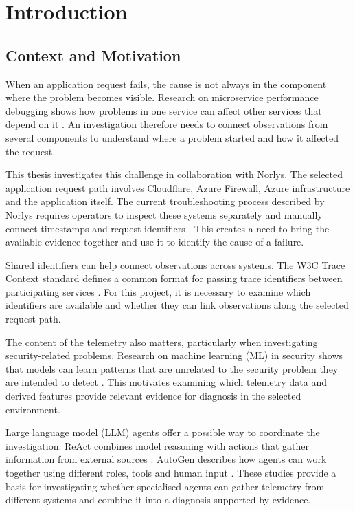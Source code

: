 \chapter{Introduction}
\label{cha:introduction}

\section{Context and Motivation}
\label{sec:introduction:context}

When an application request fails, the cause is not always in the component
where the problem becomes visible. Research on microservice performance
debugging shows how problems in one service can affect other services that
depend on it \parencite{gan2021sage}. An investigation therefore needs to
connect observations from several components to understand where a problem
started and how it affected the request.

This thesis investigates this challenge in collaboration with Norlys. The
selected application request path involves Cloudflare, Azure Firewall,
Azure infrastructure and the application itself. The current troubleshooting
process described by Norlys requires operators to inspect these systems
separately and manually connect timestamps and request identifiers
\parencite[Background]{norlys_operations_agents}. This creates a need to
bring the available evidence together and use it to identify the cause of
a failure.

Shared identifiers can help connect observations across systems. The W3C
Trace Context standard defines a common format for passing trace identifiers
between participating services \parencite{w3c2021tracecontext}. For this
project, it is necessary to examine which identifiers are available and
whether they can link observations along the selected request path.

The content of the telemetry also matters, particularly when investigating
security-related problems. Research on machine learning (ML) in security shows
that models can learn patterns that are unrelated to the security problem
they are intended to detect \parencite{arp2022dosdonts}. This motivates
examining which telemetry data and derived features provide relevant
evidence for diagnosis in the selected environment.

Large language model (LLM) agents offer a possible way to coordinate the
investigation. ReAct combines model reasoning with actions that gather
information from external sources \parencite{yao2023react}. AutoGen describes
how agents can work together using different roles, tools and human input
\parencite{wu2023autogen}. These studies provide a basis for investigating
whether specialised agents can gather telemetry from different systems and
combine it into a diagnosis supported by evidence.


